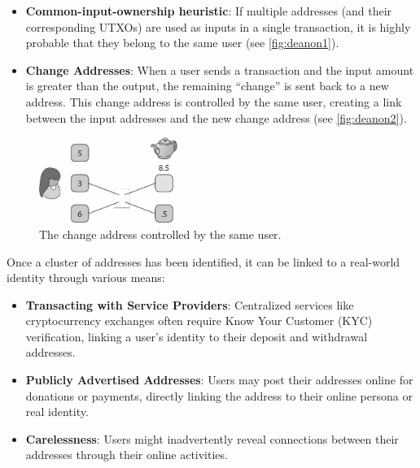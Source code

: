 \begin{itemize}
\tightlist
\item
  \textbf{Common-input-ownership heuristic}: If multiple addresses (and
  their corresponding UTXOs) are used as inputs in a single transaction,
  it is highly probable that they belong to the same user (see \autoref{fig:deanon1}).
\item
  \textbf{Change Addresses}: When a user sends a transaction and the
  input amount is greater than the output, the remaining ``change'' is
  sent back to a new address. This change address is controlled by the
  same user, creating a link between the input addresses and the new
  change address (see \autoref{fig:deanon2}).
\end{itemize}

\begin{figure}[t]
	\begin{center}
		\includegraphics[width=0.4\textwidth]{./figs/deanon2.png}
		\caption{The change address controlled by the same user.}		
		\label{fig:deanon2}
	\end{center}	
\end{figure}


Once a cluster of addresses has been identified, it can be linked to a
real-world identity through various means:

\begin{itemize}
\tightlist
\item
  \textbf{Transacting with Service Providers}: Centralized services like
  cryptocurrency exchanges often require Know Your Customer (KYC)
  verification, linking a user's identity to their deposit and
  withdrawal addresses.
\item
  \textbf{Publicly Advertised Addresses}: Users may post their addresses
  online for donations or payments, directly linking the address to
  their online persona or real identity.
\item
  \textbf{Carelessness}: Users might inadvertently reveal connections
  between their addresses through their online activities.
\end{itemize}

